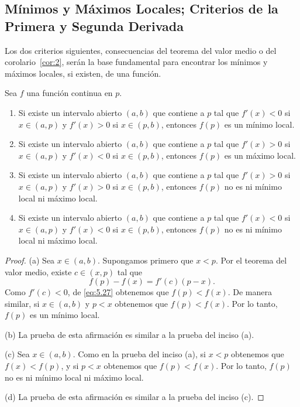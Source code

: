 \documentclass[12pt,a4paper]{book}
\begin{document}
    \subsection{Mínimos y Máximos Locales; Criterios de la Primera y Segunda Derivada}\label{subsec:criterios}

    Los dos criterios siguientes, consecuencias del teorema del valor medio o del
    corolario~\ref{cor:2}, serán la base fundamental para encontrar los mínimos y máximos
    locales, si existen, de una función.

    \begin{proposicion}\label{prop:65}
        Sea $f$ una función
        continua en $p$.
        \begin{enumerate}[nosep]
            \item Si existe un intervalo abierto $(a,b)$ que contiene a $p$ tal que $f'(x)<0$ si
            $x\in(a,p)$ y $f'(x)>0$ si $x\in(p,b)$, entonces $f(p)$ es un mínimo local.
            \item Si existe un intervalo abierto $(a,b)$ que contiene a $p$ tal que $f'(x)>0$ si
            $x\in(a,p)$ y $f'(x)<0$ si $x\in(p,b)$, entonces $f(p)$ es un máximo local.
            \item Si existe un intervalo abierto $(a,b)$ que contiene a $p$ tal que $f'(x)>0$ si
            $x\in(a,p)$ y $f'(x)>0$ si $x\in(p,b)$, entonces $f(p)$ no es ni mínimo local
            ni máximo local.
            \item Si existe un intervalo abierto $(a,b)$ que contiene a $p$ tal que $f'(x)<0$ si
            $x\in(a,p)$ y $f'(x)<0$ si $x\in(p,b)$, entonces $f(p)$ no es ni mínimo local
            ni máximo local.
        \end{enumerate}
    \end{proposicion}

    \begin{proof}
        (a) Sea $x\in(a,b)$. Supongamos primero que $x<p$. Por el
        teorema del valor medio, existe $c\in(x,p)$ tal que
        \begin{equation}\label{eq:5.27}
            f(p)-f(x)=f'(c)(p-x).
        \end{equation}
        Como $f'(c)<0$, de \eqref{eq:5.27} obtenemos que $f(p)<f(x)$. De manera similar,
        si $x\in(a,b)$ y $p<x$ obtenemos que $f(p)<f(x)$. Por lo tanto, $f(p)$ es un
        mínimo local.

        (b) La prueba de esta afirmación es similar a la prueba del inciso (a).

        (c) Sea $x\in(a,b)$. Como en la prueba del inciso (a), si $x<p$ obtenemos
        que $f(x)<f(p)$, y si $p<x$ obtenemos que $f(p)<f(x)$. Por lo tanto, $f(p)$
        no es ni mínimo local ni máximo local.

        (d) La prueba de esta afirmación es similar a la prueba del inciso (c).
    \end{proof}
\end{document}
